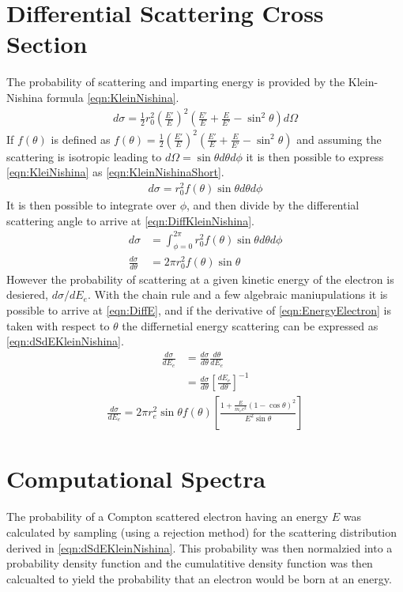 \section{Differential Scattering Cross Section}
The probability of scattering and imparting energy is provided by the Klein-Nishina formula \eqref{eqn:KleinNishina}.
\begin{align}
  \label{eqn:KleinNishina}
  d\sigma = \frac{1}{2} r_0^2 \left(\frac{E'}{E}\right)^2 \left(\frac{E'}{E} + \frac{E}{E'}-\sin^2\theta\right)d\Omega
\end{align}
If $f(\theta)$ is defined as $f(\theta) = \frac{1}{2}\left(\frac{E'}{E}\right)^2 \left(\frac{E'}{E} + \frac{E}{E'}-\sin^2\theta\right)$ and assuming the scattering is isotropic leading to $d\Omega = \sin\theta d\theta d\phi$ it is then possible to express \eqref{eqn:KleiNishina} as \eqref{eqn:KleinNishinaShort}.
\begin{align}
  \label{eqn:KleinNishinaShort}
    d\sigma = r_0^2 f(\theta)\sin\theta d\theta d\phi
\end{align}
It is then possible to integrate over $\phi$, and then divide by the differential scattering angle to arrive at \eqref{eqn:DiffKleinNishina}.
\begin{align}
  \label{eqn:DiffKleinNishina}
  d\sigma &=\int_{\phi=0}^{2\pi} r_0^2 f(\theta)\sin\theta d\theta d\phi\\
  \frac{d\sigma}{d\theta} &=2\pi r_0^2 f(\theta)\sin\theta
\end{align}
However the probability of scattering at a given kinetic energy of the electron is desiered, $d\sigma/dE_e$.
With the chain rule and a few algebraic maniupulations it is possible to arrive at \eqref{eqn:DiffE}, and if the derivative of \eqref{eqn:EnergyElectron} is taken with respect to $\theta$ the differnetial energy scattering can be expressed as \eqref{eqn:dSdEKleinNishina}.
\begin{align}
  \label{eqn:DiffE}
  \frac{d\sigma}{dE_e} & = \frac{d\sigma}{d\theta} \frac{d\theta}{dE_e} \\
   & = \frac{d\sigma}{d\theta} \left[\frac{dE_e}{d\theta}\right]^{-1} 
\end{align}
\begin{align}
  \label{eqn:dSdEKleinNishina}
\frac{d\sigma}{dE_e} = 2\pi r_e^2 \sin \theta f(\theta)\left [ \frac{1+\frac{E}{m_e c^2}\left(1-\cos\theta \right)^2}{E^2 \sin \theta} \right ]
\end{align}

\section{Computational Spectra}
The probability of a Compton scattered electron having an energy $E$ was calculated by sampling (using a rejection method) for the scattering distribution derived in \autoref{eqn:dSdEKleinNishina}.
This probability was then normalzied into a probability density function and the cumulatitive density function was then calcualted to yield the probability that an electron would be born at an energy.

